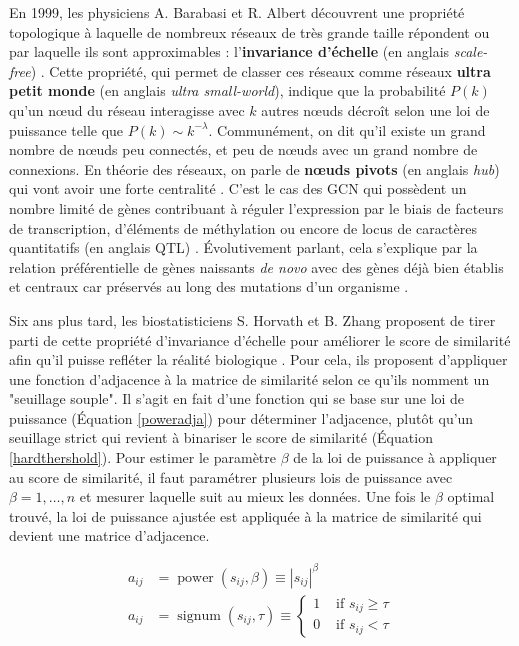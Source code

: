 En 1999, les physiciens A. Barabasi et R. Albert découvrent une propriété topologique à laquelle de nombreux réseaux de très grande taille répondent ou par laquelle ils sont approximables \cite{Broido2019Mar} : l'\textbf{invariance d'échelle} (en anglais \textit{scale-free}) \cite{Barabasi1999Oct}. Cette propriété, qui permet de classer ces réseaux comme réseaux \textbf{ultra petit monde} \cite{Cohen2003Feb} (en anglais \textit{ultra small-world}), indique que la probabilité $P(k)$ qu'un nœud du réseau interagisse avec $k$ autres nœuds décroît selon une loi de puissance telle que $P(k) \sim k^{-\lambda}$. Communément, on dit qu'il existe un grand nombre de nœuds peu connectés, et peu de nœuds avec un grand nombre de connexions. En théorie des réseaux, on parle de \textbf{nœuds pivots} (en anglais \textit{hub}) qui vont avoir une forte centralité \cite{VanDam2018}. C'est le cas des \acrshort{GCN} qui possèdent un nombre limité de gènes contribuant à réguler l'expression par le biais de facteurs de transcription, d'éléments de méthylation ou encore de locus de caractères quantitatifs (en anglais \acrfull{QTL}) \cite{Serin2016}. Évolutivement parlant, cela s'explique par la relation préférentielle de gènes naissants \textit{de novo} avec des gènes déjà bien établis et centraux car préservés au long des mutations d'un organisme \cite{Barabasi2004}.


Six ans plus tard, les biostatisticiens S. Horvath et B. Zhang proposent de tirer parti de cette propriété d'invariance d'échelle pour améliorer le score de similarité afin qu'il puisse refléter la réalité biologique \cite{Zhang2005a}. Pour cela, ils proposent d'appliquer une fonction d'adjacence à la matrice de similarité selon ce qu'ils nomment un "seuillage souple". Il s'agit en fait d'une fonction qui se base sur une loi de puissance (Équation \ref{poweradja}) pour déterminer l'adjacence, plutôt qu'un seuillage strict qui revient à binariser le score de similarité (Équation \ref{hardthershold}). Pour estimer le paramètre $\beta$ de la loi de puissance à appliquer au score de similarité, il faut paramétrer plusieurs lois de puissance avec $\beta = 1, \dots, n$ et mesurer laquelle suit au mieux les données. Une fois le $\beta$ optimal trouvé, la loi de puissance ajustée est appliquée à la matrice de similarité qui devient une matrice d'adjacence. 

\begin{align} 
    a_{i j} &= \operatorname{power}\left(s_{i j}, \beta\right) \equiv\left|s_{i j}\right|^{\beta} \label{poweradja} \\
    a_{i j} &= \operatorname{signum}\left(s_{i j}, \tau\right) \equiv \begin{cases}1 & \text { if } s_{i j} \geq \tau \\ 0 & \text { if } s_{i j}<\tau\end{cases} \label{hardthershold}
\end{align}

